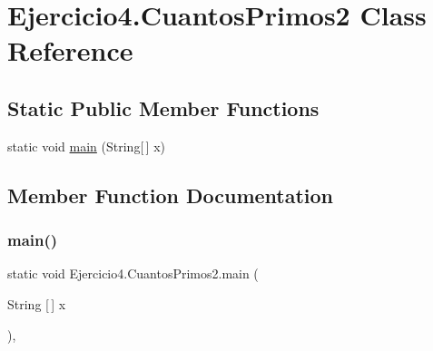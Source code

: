 \hypertarget{class_ejercicio4_1_1_cuantos_primos2}{}\section{Ejercicio4.\+Cuantos\+Primos2 Class Reference}
\label{class_ejercicio4_1_1_cuantos_primos2}
\subsection*{Static Public Member Functions}
\begin{DoxyCompactItemize}
\item 
static void \mbox{\hyperlink{class_ejercicio4_1_1_cuantos_primos2_aea16483ae02a004005ce92f4697dbe19}{main}} (String\mbox{[}$\,$\mbox{]} x)
\end{DoxyCompactItemize}


\subsection{Member Function Documentation}
\mbox{\label{class_ejercicio4_1_1_cuantos_primos2_aea16483ae02a004005ce92f4697dbe19}} 
\subsubsection{\texorpdfstring{main()}{main()}}
{\footnotesize\ttfamily static void Ejercicio4.\+Cuantos\+Primos2.\+main (\begin{DoxyParamCaption}\item[{String \mbox{[}$\,$\mbox{]}}]{x }\end{DoxyParamCaption})\hspace{0.3cm}{\ttfamily [inline]}, {\ttfamily [static]}}


